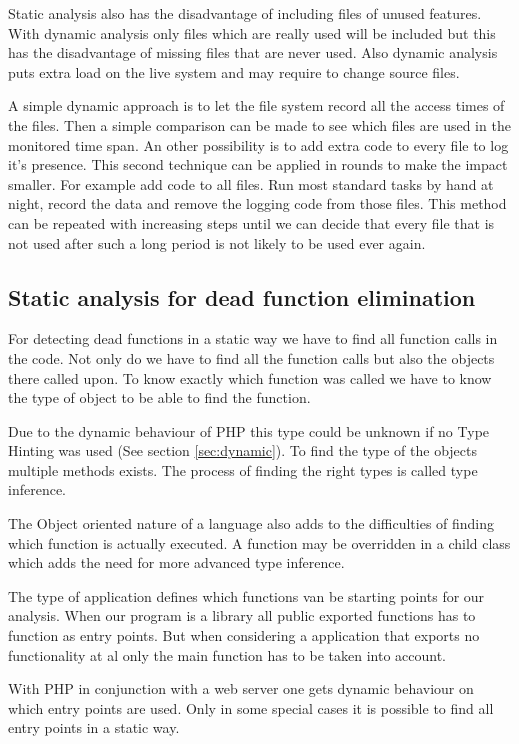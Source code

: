 \documentclass[a4paper,10pt,twocolumn]{article}
\begin{document}
Static analysis also has the disadvantage of including files of unused features. With dynamic analysis only files which are really used will be included but this has the disadvantage of missing files that are never used. Also dynamic analysis puts extra load on the live system and may require to change source files.

A simple dynamic approach is to let the file system record all the access times of the files. Then a simple comparison can be made to see which files are used in the monitored time span. An other possibility is to add extra code to every file to log it's presence. This second technique can be applied in rounds to make the impact smaller. For example add code to all files. Run most standard tasks by hand at night, record the data and remove the logging code from those files. This method can be repeated with increasing steps until we can decide that every file that is not used after such a long period is not likely to be used ever again.


\subsection{Static analysis for dead function elimination}

For detecting dead functions in a static way we have to find all function calls in the code. Not only do we have to find all the function calls but also the objects there called upon. To know exactly which function was called we have to know the type of object to be able to find the function.

Due to the dynamic behaviour of PHP this type could be unknown if no Type Hinting was used  (See section \ref{sec:dynamic}). To find the type of the objects multiple methods exists. The process of finding the right types is called type inference\cite{bacon1996,biggar2010,tratt2009}. 

The Object oriented nature of a language also adds to the difficulties of finding which function is actually executed\cite{bacon1996,chen1998}. A function may be overridden in a child class which adds the need for more advanced type inference.

The type of application defines which functions van be starting points for our analysis. When our program is a library all public exported functions has to function as entry points. But when considering a application that exports no functionality at al only the main function has to be taken into account.

With PHP in conjunction with a web server one gets dynamic behaviour on which entry points are used. Only in some special cases it is possible to find all entry points in a static way.
\end{document}
